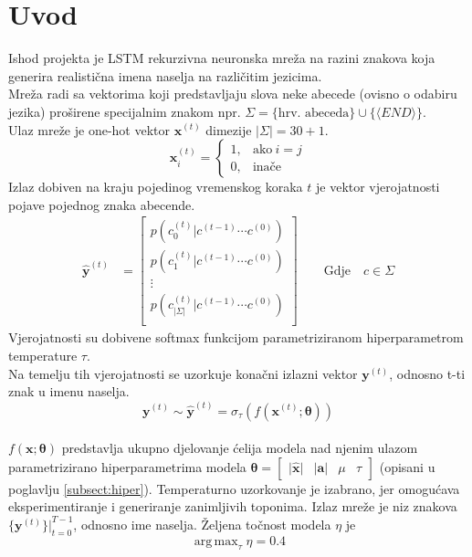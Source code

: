 \documentclass[conference]{IEEEtran}
\DeclareMathOperator*{\argmax}{arg\,max}
\begin{document}
\section{Uvod}
\label{sect:intro}
Ishod projekta je LSTM rekurzivna neuronska mreža na razini znakova koja generira realistična imena naselja na različitim jezicima.\\
Mreža radi sa vektorima koji predstavljaju slova neke abecede (ovisno o odabiru jezika) proširene specijalnim znakom npr. $\Sigma = \{ \text{hrv. abeceda}\} \cup \{\langle END \rangle\}$.\\
Ulaz mreže je one-hot vektor $\mathbf{x}^{(t)}$ dimezije $\lvert \Sigma \rvert = 30 + 1$.
\begin{equation}
\mathbf{x}^{(t)}_i=
    \begin{cases}
      1, & \text{ako}\ i=j \\
      0, & \text{inače}
    \end{cases}
\end{equation}
Izlaz dobiven na kraju pojedinog vremenskog koraka $t$ je vektor vjerojatnosti pojave pojednog znaka abecende.\\
\begin{align}
    \hat{\mathbf{y}}^{(t)} &= \begin{bmatrix}
           p(c_0^{(t)} | c^{(t-1)} \cdots c^{(0)} ) \\
           p(c_1^{(t)} | c^{(t-1)} \cdots c^{(0)} ) \\
           \vdots \\
           p(c_{\lvert \Sigma \rvert}^{(t)} | c^{(t-1)} \cdots c^{(0)} ) \\
         \end{bmatrix}
         \quad \quad \text{Gdje} \quad c \in \Sigma
\end{align}
Vjerojatnosti su dobivene softmax funkcijom parametriziranom hiperparametrom temperature $\tau$.\\
Na temelju tih vjerojatnosti se uzorkuje konačni izlazni vektor $\mathbf{y}^{(t)}$, odnosno t-ti znak u imenu naselja.\\
\begin{equation}
 \mathbf{y}^{(t)} \sim \hat{\mathbf{y}}^{(t)} = \sigma_{\tau}(f(\mathbf{x}^{(t)} ; \boldsymbol{\theta}))
\end{equation}
\ \\
$f(\mathbf{x} ; \boldsymbol{\theta})$ predstavlja ukupno djelovanje ćelija modela nad njenim ulazom parametrizirano hiperparametrima modela $\boldsymbol{\theta} = \begin{bmatrix} \lvert \mathbf{\hat{x}} \rvert & \lvert \mathbf{a} \rvert & \mu & \tau \end{bmatrix}$ (opisani u poglavlju \ref{subsect:hiper}).
Temperaturno uzorkovanje je izabrano, jer omogućava eksperimentiranje i generiranje zanimljivih toponima.
Izlaz mreže je niz znakova $\{\mathbf{y}^{(t)}\} \biggr \rvert_{t=0}^{T-1}$, odnosno ime naselja.
Željena točnost modela $\eta$ je \[\argmax_{\tau} \eta = 0.4\]
\end{document}

